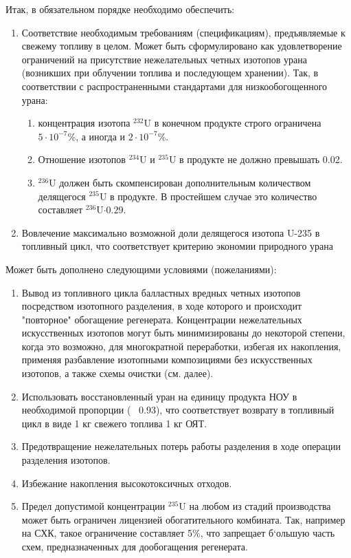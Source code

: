 Итак, в обязательном порядке необходимо обеспечить:
\begin{enumerate}
  \item Соответствие необходимым требованиям (спецификациям), предъявляемые к свежему топливу в целом. Может быть сформулировано как удовлетворение ограничений на присутствие нежелательных четных изотопов урана (возникших при облучении топлива и последующем хранении). Так, в соответствии с распространенными стандартами для низкообогощенного урана:
  \begin{enumerate}
    \item концентрация изотопа $^{232}$U в конечном продукте строго ограничена $5\cdot10^{-7}$\%, а иногда и $2\cdot10^{-7}$\%.
    \item Отношение изотопов $^{234}$U и $^{235}$U в продукте не должно превышать 0.02.
    \item $^{236}$U должен быть скомпенсирован дополнительным количеством делящегося $^{235}$U в продукте. В простейшем случае это количество составляет $^{236}$U$\cdot0.29$.
  \end{enumerate}
  \item Вовлечение максимально возможной доли делящегося изотопа U-235 в топливный цикл, что соответствует критерию экономии природного урана
\end{enumerate}

Может быть дополнено следующими условиями (пожеланиями):
\begin{enumerate}
  \item Вывод из топливного цикла балластных вредных четных изотопов посредством изотопного разделения, в ходе которого и происходит "повторное" обогащение регенерата. Концентрации нежелательных искусственных изотопов могут быть минимизированы до некоторой степени, когда это возможно, для многократной переработки, избегая их накопления, применяя разбавление изотопными композициями без искусственных изотопов, а также схемы очистки (см. далее).
  \item Использовать восстановленный уран на единицу продукта НОУ в необходимой пропорции (~ 0.93), что соответствует возврату в топливный цикл в виде 1 кг свежего топлива 1 кг ОЯТ.
  \item Предотвращение нежелательных потерь работы разделения в ходе операции разделения изотопов.
  \item Избежание накопления высокотоксичных отходов.
  \item Предел допустимой концентрации $^{235}$U на любом из стадий производства может быть ограничен лицензией обогатительного комбината. Так, например на СХК, такое ограничение составляет 5\%, что запрещает б`ольшую часть схем, предназначенных для дообогащения регенерата.
\end{enumerate}


